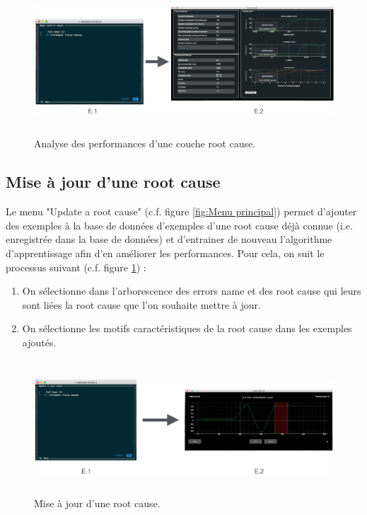 \begin{figure}[H]
	\centering\includegraphics[height=5.5cm]{images/perf_menu.png}
	\caption[Analyse des performances d'une couche root cause]{Analyse des performances d'une couche root cause.}
	\label{fig: Analyse des performances d'une couche root cause}
\end{figure} 


\subsection{Mise à jour d'une root cause}
\label{Industrialisation du produit: Utilisation suggérée des outils: Mise à jour d'une root cause}
Le menu "Update a root cause"  (c.f. figure \ref{fig:Menu principal}) permet d'ajouter des exemples à la base de données d'exemples d'une root cause déjà connue (i.e. enregistrée dans la base de données) et d'entrainer de nouveau l'algorithme d'apprentissage afin d'en améliorer les performances. Pour cela, on suit le processus suivant (c.f. figure \ref{fig: Analyse des performances d'une couche root cause}) : 
\begin{enumerate}
	\item On sélectionne dans l'arborescence des errors name et des root cause qui leurs sont liées la root cause que l'on souhaite mettre à jour.
	\item On sélectionne les motifs caractéristiques de la root cause dans les exemples ajoutés.
\end{enumerate}

\begin{figure}[H]
	\centering\includegraphics[height=5cm]{images/update_menu.png}
	\caption[Mise à jour d'une root cause]{Mise à jour d'une root cause.}
	\label{fig: Mise à jour d'une root cause}
\end{figure} 


